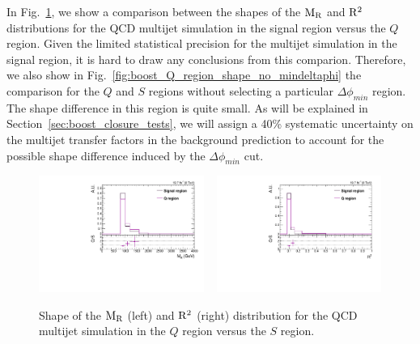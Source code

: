 % 
% 
% 


In Fig.~\ref{fig:boost_Q_region_shape}, we show a comparison between the shapes of the $\mathrm{M_R}$ and
$\mathrm{R^2}$ distributions for the QCD multijet simulation in the signal region versus the $Q$ region.
Given the limited statistical precision for the multijet simulation in the signal region, it is
hard to draw any conclusions from this comparion. Therefore, we also show in
Fig.~\ref{fig:boost_Q_region_shape_no_mindeltaphi} the comparison for the $Q$ and $S$ regions
without selecting a particular $\Delta\phi_{min}$ region. The shape difference in this
region is quite small. As will be explained in Section~\ref{sec:boost_closure_tests}, we will assign
a 40\% systematic uncertainty on the multijet transfer factors in the background prediction to
account for the possible shape difference induced by the $\Delta\phi_{min}$ cut. 

\begin{figure}[htbp]
\centering
\includegraphics[width=0.48\textwidth]{figures/razor_selection/shapeplots/MR_comparison_QCD_SIG}
~
\includegraphics[width=0.48\textwidth]{figures/razor_selection/shapeplots/R2_comparison_QCD_SIG}
\caption{Shape of the $\mathrm{M_R}$ (left) and $\mathrm{R^2}$ (right) distribution for the QCD multijet simulation
in the $Q$ region versus the $S$ region. 
\label{fig:boost_Q_region_shape}}
\end{figure}

